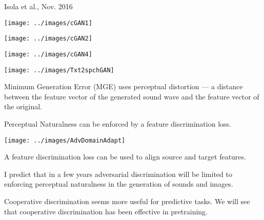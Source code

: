 {
{Isola et al., Nov. 2016}

\centerline{\texttt{[image: ../images/cGAN1]}}


\centerline{\texttt{[image: ../images/cGAN2]}}


\centerline{\texttt{[image: ../images/cGAN4]}}



\centerline{\texttt{[image: ../images/Txt2spchGAN]}}

\vfill
Minimum Generation Error (MGE) uses {\color{red} perceptual distortion} ---
a distance between the feature vector of the generated sound wave and the
feature vector of the original.

\vfill
{\color{red}Perceptual Naturalness} can be enforced by a feature discrimination loss.


\centerline{\texttt{[image: ../images/AdvDomainAdapt]}}

A feature discrimination loss can be used to align source and target features.


\vfill
I predict that in a few years adversarial discrimination will be limited to enforcing perceptual naturalness in the generation of sounds and images.

\vfill
Cooperative discrimination seems more useful for predictive tasks. We will see that cooperative discrimination has been effective in pretraining.

}

